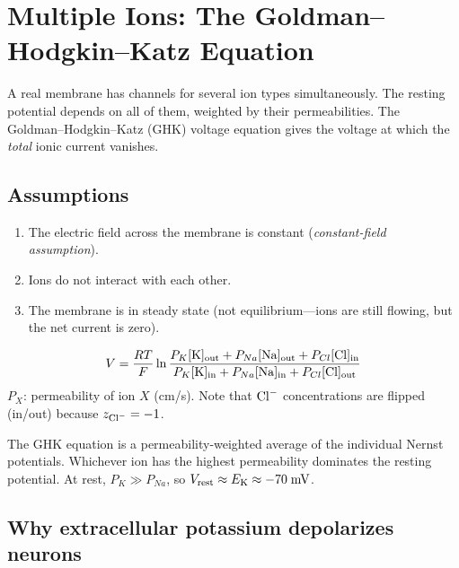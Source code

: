\section{Multiple Ions: The Goldman--Hodgkin--Katz Equation}
\label{sec:ghk}

A real membrane has channels for several ion types simultaneously. The resting potential depends on all of them, weighted by their permeabilities. The Goldman--Hodgkin--Katz (GHK) voltage equation gives the voltage at which the \emph{total} ionic current vanishes.

\subsection{Assumptions}

\begin{enumerate}
  \item The electric field across the membrane is constant (\emph{constant-field assumption}).
  \item Ions do not interact with each other.
  \item The membrane is in steady state (not equilibrium---ions are still flowing, but the net current is zero).
\end{enumerate}

\begin{keyequation}
\begin{equation}
  V = \frac{RT}{F}\ln\frac{
    P_K[\mathrm{K}]_{\text{out}} + P_{Na}[\mathrm{Na}]_{\text{out}} + P_{Cl}[\mathrm{Cl}]_{\text{in}}
  }{
    P_K[\mathrm{K}]_{\text{in}} + P_{Na}[\mathrm{Na}]_{\text{in}} + P_{Cl}[\mathrm{Cl}]_{\text{out}}
  }
  \label{eq:ghk}
\end{equation}
\tcblower
$P_X$: permeability of ion $X$ (cm/s). Note that $\mathrm{Cl}^-$ concentrations are flipped (in/out) because $z_{\mathrm{Cl}^-} = -1$.
\end{keyequation}

\begin{aside}
The GHK equation is a permeability-weighted average of the individual Nernst potentials. Whichever ion has the highest permeability dominates the resting potential. At rest, $P_K \gg P_{Na}$, so $V_{\text{rest}} \approx E_{\mathrm{K}} \approx -70\;\text{mV}$.
\end{aside}

\subsection{Why extracellular potassium depolarizes neurons}

